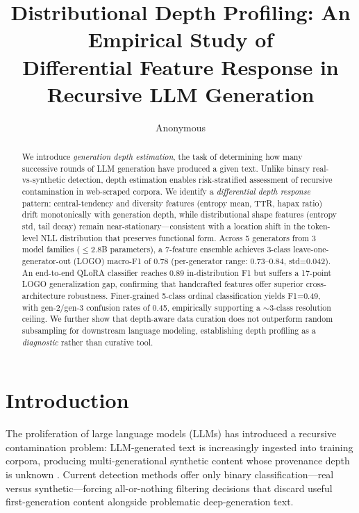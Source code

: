 \documentclass[11pt,a4paper]{article}
\title{Distributional Depth Profiling: An Empirical Study of\\Differential Feature Response in Recursive LLM Generation}
\author{Anonymous}
\begin{document}
\maketitle

\begin{abstract}
We introduce \emph{generation depth estimation}, the task of determining how many successive rounds of LLM generation have produced a given text.
Unlike binary real-vs-synthetic detection, depth estimation enables risk-stratified assessment of recursive contamination in web-scraped corpora.
We identify a \emph{differential depth response} pattern: central-tendency and diversity features (entropy mean, TTR, hapax ratio) drift monotonically with generation depth, while distributional shape features (entropy std, tail decay) remain near-stationary---consistent with a location shift in the token-level NLL distribution that preserves functional form.
Across 5 generators from 3 model families ($\leq$2.8B parameters), a 7-feature ensemble achieves 3-class leave-one-generator-out (LOGO) macro-F1 of 0.78 (per-generator range: 0.73--0.84, std=0.042).
An end-to-end QLoRA classifier reaches 0.89 in-distribution F1 but suffers a 17-point LOGO generalization gap, confirming that handcrafted features offer superior cross-architecture robustness.
Finer-grained 5-class ordinal classification yields F1=0.49, with gen-2/gen-3 confusion rates of 0.45, empirically supporting a $\sim$3-class resolution ceiling.
We further show that depth-aware data curation does not outperform random subsampling for downstream language modeling, establishing depth profiling as a \emph{diagnostic} rather than curative tool.
\end{abstract}

\section{Introduction}

The proliferation of large language models (LLMs) has introduced a recursive contamination problem: LLM-generated text is increasingly ingested into training corpora, producing multi-generational synthetic content whose provenance depth is unknown \cite{shumailov2024model}.
Current detection methods offer only binary classification---real versus synthetic---forcing all-or-nothing filtering decisions that discard useful first-generation content alongside problematic deep-generation text.
\end{document}
